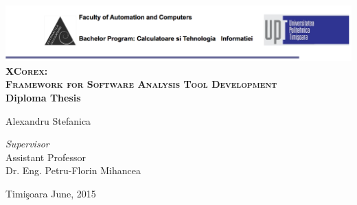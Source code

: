 \begin{titlepage}
	\begin{center}	
		\includegraphics[width=\textwidth]{../img/header.png}\\[4cm]
		
		{\huge \bfseries \textsc{XCorex:\vspace{2.5mm}\\ Framework for
Software\vspace{2.5mm} Analysis Tool Development}}
		\\[3cm]
		
		{\bfseries Diploma Thesis} \\[3cm]
								
		\begin{flushright}
				\large Alexandru Stefanica \\[1cm]
		\end{flushright}
		\begin{flushleft}
			 \large
				\emph{Supervisor} \\
				Assistant Professor \\
				Dr. Eng. Petru-Florin Mihancea \\[1cm]
		\end{flushleft}
		
		{\large {Timi\c{s}oara June, 2015}}
	\end{center}
\end{titlepage}
